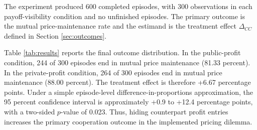 \documentclass[11pt,a4paper]{article}
\begin{document}
The experiment produced 600 completed episodes, with 300 observations in each payoff-visibility condition and no unfinished episodes. The primary outcome is the mutual price-maintenance rate and the estimand is the treatment effect $\Delta_{CC}$ defined in Section \ref{sec:outcomes}.

Table \ref{tab:results} reports the final outcome distribution. In the public-profit condition, 244 of 300 episodes end in mutual price maintenance (81.33 percent). In the private-profit condition, 264 of 300 episodes end in mutual price maintenance (88.00 percent). The treatment effect is therefore +6.67 percentage points. Under a simple episode-level difference-in-proportions approximation, the 95 percent confidence interval is approximately +0.9 to +12.4 percentage points, with a two-sided $p$-value of 0.023. Thus, hiding counterpart profit entries increases the primary cooperation outcome in the implemented pricing dilemma.

\begin{table}[H]
\centering
\small
{}
\caption{Final outcomes by profit-observability condition. $CC$ = mutual price maintenance; $CD/DC$ = one-sided undercutting; $DD$ = mutual undercutting.}
\label{tab:results}
\end{table}
\end{document}
